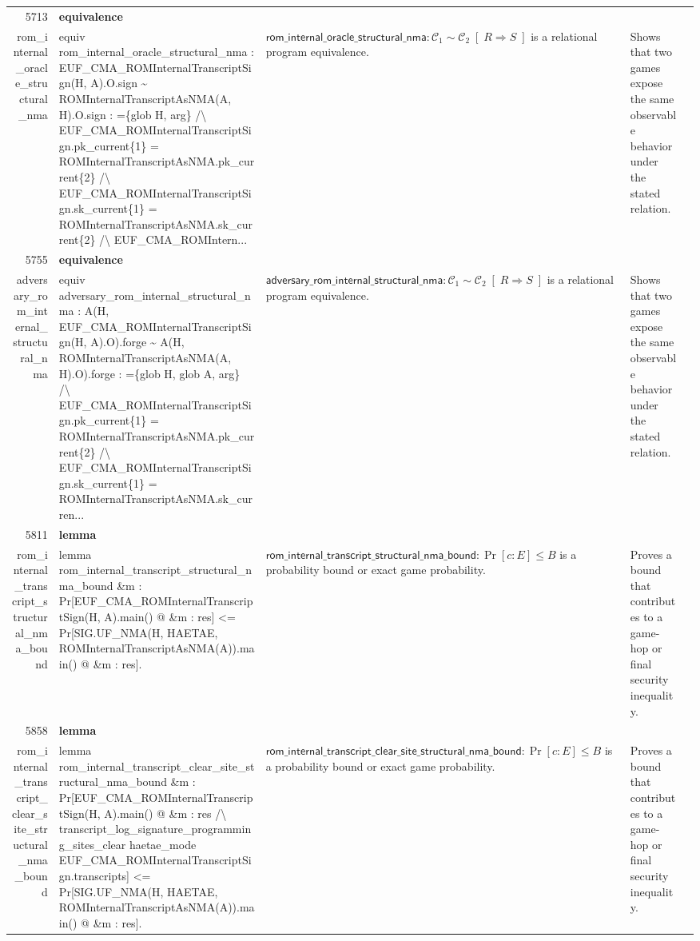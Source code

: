 \documentclass[10pt]{article}
\newcommand{\ec}[1]{\begingroup\ttfamily\scriptsize #1\endgroup}
\begin{document}
\begin{longtable}{r L{0.17\textwidth} L{0.26\textwidth} L{0.27\textwidth} L{0.20\textwidth}}
5713 & \textbf{equivalence}\\\ec{rom\_internal\_oracle\_structural\_nma} & \ec{equiv rom\_internal\_oracle\_structural\_nma : EUF\_CMA\_ROMInternalTranscriptSign(H, A).O.sign \textasciitilde{} ROMInternalTranscriptAsNMA(A, H).O.sign : =\{glob H, arg\} /\textbackslash{} EUF\_CMA\_ROMInternalTranscriptSign.pk\_current\{1\} = ROMInternalTranscriptAsNMA.pk\_current\{2\} /\textbackslash{} EUF\_CMA\_ROMInternalTranscriptSign.sk\_current\{1\} = ROMInternalTranscriptAsNMA.sk\_current\{2\} /\textbackslash{} EUF\_CMA\_ROMIntern...} & \(\mathsf{rom\_internal\_oracle\_structural\_nma} : \mathcal{C}_1 \sim \mathcal{C}_2 \;[\;R \Rightarrow S\;]\) is a relational program equivalence. & Shows that two games expose the same observable behavior under the stated relation. \\
5755 & \textbf{equivalence}\\\ec{adversary\_rom\_internal\_structural\_nma} & \ec{equiv adversary\_rom\_internal\_structural\_nma : A(H, EUF\_CMA\_ROMInternalTranscriptSign(H, A).O).forge \textasciitilde{} A(H, ROMInternalTranscriptAsNMA(A, H).O).forge : =\{glob H, glob A, arg\} /\textbackslash{} EUF\_CMA\_ROMInternalTranscriptSign.pk\_current\{1\} = ROMInternalTranscriptAsNMA.pk\_current\{2\} /\textbackslash{} EUF\_CMA\_ROMInternalTranscriptSign.sk\_current\{1\} = ROMInternalTranscriptAsNMA.sk\_curren...} & \(\mathsf{adversary\_rom\_internal\_structural\_nma} : \mathcal{C}_1 \sim \mathcal{C}_2 \;[\;R \Rightarrow S\;]\) is a relational program equivalence. & Shows that two games expose the same observable behavior under the stated relation. \\
5811 & \textbf{lemma}\\\ec{rom\_internal\_transcript\_structural\_nma\_bound} & \ec{lemma rom\_internal\_transcript\_structural\_nma\_bound \&m : Pr[EUF\_CMA\_ROMInternalTranscriptSign(H, A).main() @ \&m : res] <= Pr[SIG.UF\_NMA(H, HAETAE, ROMInternalTranscriptAsNMA(A)).main() @ \&m : res].} & \(\mathsf{rom\_internal\_transcript\_structural\_nma\_bound} : \Pr[c : E] \le B\) is a probability bound or exact game probability. & Proves a bound that contributes to a game-hop or final security inequality. \\
5858 & \textbf{lemma}\\\ec{rom\_internal\_transcript\_clear\_site\_structural\_nma\_bound} & \ec{lemma rom\_internal\_transcript\_clear\_site\_structural\_nma\_bound \&m : Pr[EUF\_CMA\_ROMInternalTranscriptSign(H, A).main() @ \&m : res /\textbackslash{} transcript\_log\_signature\_programming\_sites\_clear haetae\_mode EUF\_CMA\_ROMInternalTranscriptSign.transcripts] <= Pr[SIG.UF\_NMA(H, HAETAE, ROMInternalTranscriptAsNMA(A)).main() @ \&m : res].} & \(\mathsf{rom\_internal\_transcript\_clear\_site\_structural\_nma\_bound} : \Pr[c : E] \le B\) is a probability bound or exact game probability. & Proves a bound that contributes to a game-hop or final security inequality. \\

\end{longtable}
\end{document}
